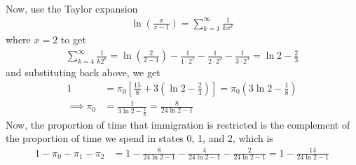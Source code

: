 \documentclass{article}
\begin{document}
\begin{itemize}
\begin{enumerate}[(a)]
\begin{soln}
\begin{align*}
					\end{align*}
					Now, use the Taylor expansion
					\begin{align*}
						\ln\left( \frac{x}{x-1} \right) = \sum_{k=1}^{\infty} \frac{1}{kx^k}
					\end{align*}
					where $x=2$ to get
					\begin{align*}
						\sum_{k=4}^{\infty} \frac{1}{k2^k} = \ln\left( \frac{2}{2-1} \right) - \frac{1}{1\cdot 2^1} - \frac{1}{2\cdot 2^2} - \frac{1}{3\cdot 2^3} = \ln 2 - \frac{2}{3} 
					\end{align*}
					and substituting back above, we get
					\begin{align*}
						1 &= \pi_0\left[ \frac{15}{8} + 3\left( \ln 2 - \frac{2}{3} \right) \right] = \pi_0 \left( 3\ln 2-\frac{1}{8} \right) \\
						\implies \pi_0 &= \frac{1}{3\ln 2 - \frac{1}{8}} = \frac{8}{24\ln 2-1}
					\end{align*}
					Now, the proportion of time that immigration is restricted is the complement of the proportion of time we spend in states 0, 1, and 2, which is
					\begin{align*}
						1-\pi_0 - \pi_1 - \pi_2 &= 1- \frac{8}{24\ln 2-1} - \frac{4}{24\ln 2-1} - \frac{2}{24\ln 2 -1} = 1-\frac{14}{24\ln 2-1}
					\end{align*}
				\end{soln}

		\end{enumerate}
	

\end{itemize}
\end{document}
